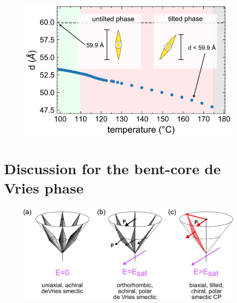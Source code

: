 \documentclass[aagreenthesis]{subfiles}
\begin{document}
\begin{figure}[h!]
    \centering
    \includegraphics{figs/pal30/xraysm1/sm1-saxs-annote.png}
    \caption{\label{}}
\end{figure}




\section{Discussion for the bent-core de Vries phase}
\begin{figure}[h!]
    \centering
    \includegraphics{figs/pal30/deVries/dvAlign.png}
    \caption{\label{}}
\end{figure}
\end{document}
